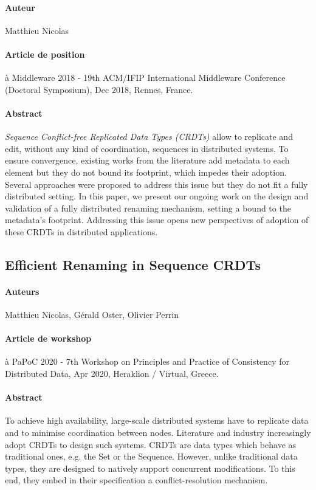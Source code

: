 \paragraph{Auteur} Matthieu Nicolas

\paragraph{Article de position} à Middleware 2018 - 19th ACM/IFIP International Middleware Conference (Doctoral Symposium), Dec 2018, Rennes, France.

\paragraph{Abstract}
\emph{Sequence Conflict-free Replicated Data Types (CRDTs)} allow to replicate and edit, without any kind of coordination, sequences in distributed systems.
To ensure convergence, existing works from the literature add metadata to each element but they do not bound its footprint, which impedes their adoption.
Several approaches were proposed to address this issue but they do not fit a fully distributed setting.
In this paper, we present our ongoing work on the design and validation of a fully distributed renaming mechanism, setting a bound to the metadata's footprint.
Addressing this issue opens new perspectives of adoption of these CRDTs in distributed applications.

\subsection*{Efficient Renaming in Sequence CRDTs \cite{2020-rls-papoc-nicolas}}

\paragraph{Auteurs} Matthieu Nicolas, Gérald Oster, Olivier Perrin

\paragraph{Article de workshop} à PaPoC 2020 - 7th Workshop on Principles and Practice of Consistency for Distributed Data, Apr 2020, Heraklion / Virtual, Greece.

\paragraph{Abstract}
To achieve high availability, large-scale distributed systems have to replicate data and to minimise coordination between nodes.
Literature and industry increasingly adopt \acfp{CRDT} to design such systems.
\acp{CRDT} are data types which behave as traditional ones, e.g. the Set or the Sequence.
However, unlike traditional data types, they are designed to natively support concurrent modifications.
To this end, they embed in their specification a conflict-resolution mechanism.


